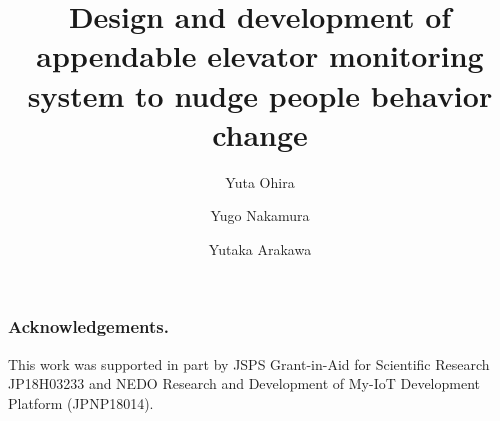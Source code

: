 \documentclass[runningheads]{llncs}
\begin{document}
\title{
  Design and development of appendable elevator monitoring system to nudge people behavior change
}

\author{
  Yuta Ohira \and
  Yugo Nakamura \and
  Yutaka Arakawa
}



\maketitle

\thispagestyle{fancy}








\subsubsection{Acknowledgements.}
This work was supported in part by JSPS Grant-in-Aid for Scientific Research JP18H03233 and NEDO Research and Development of My-IoT Development Platform (JPNP18014).

\thispagestyle{guusuu}

%
%
%

% 
% 


\thispagestyle{guusuu}
\end{document}
